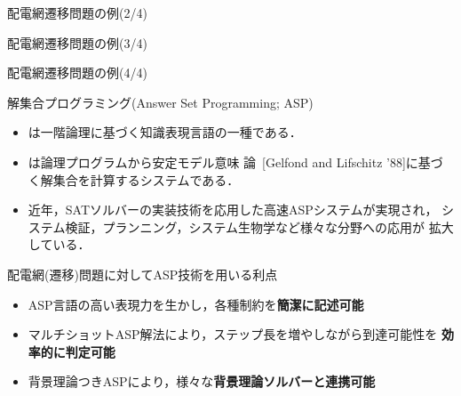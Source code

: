 \documentclass[dvipdfmx,11pt]{beamer}
\begin{document}
%
\begin{frame}{配電網遷移問題の例(2/4)}
  \vfill
 \begin{figure}[t]
  \centering
  \scalebox{0.65}{}
  \vspace{-0.1cm}
  \caption*{}
 \end{figure}
\end{frame}
%
\begin{frame}{配電網遷移問題の例(3/4)}
  \vfill
 \begin{figure}[t]
  \centering\hspace{-0.1cm}
  \scalebox{0.65}{}
  \vspace{-0.1cm}
  \caption*{}
 \end{figure}
\end{frame}
%
\begin{frame}{配電網遷移問題の例(4/4)}
  \vfill
 \begin{figure}[t]
  \centering\hspace{-0.1cm}
  \scalebox{0.65}{}
  \vspace{-0.1cm}
  \caption*{}
 \end{figure}
\end{frame}
\begin{frame}{解集合プログラミング(Answer Set Programming; ASP)}
 \begin{itemize}
  \item {}は一階論理に基づく知識表現言語の一種である．
  \item {}は論理プログラムから安定モデル意味
        論~[Gelfond and Lifschitz '88]に基づく解集合を計算するシステムである．
  \item 近年，SATソルバーの実装技術を応用した高速ASPシステムが実現され，
        システム検証，プランニング，システム生物学など様々な分野への応用が
        拡大している．
 \end{itemize}
 \vfill
 \begin{alertblock}{配電網(遷移)問題に対してASP技術を用いる利点}
  \begin{itemize}
   \item ASP言語の高い表現力を生かし，各種制約を\textbf{簡潔に記述可能}
   \item マルチショットASP解法により，ステップ長を増やしながら到達可能性を
         \textbf{効率的に判定可能}
   \item 背景理論つきASPにより，様々な\textbf{背景理論ソルバーと連携可能}
  \end{itemize}
 \end{alertblock} \vfill
\end{frame}
\end{document}
